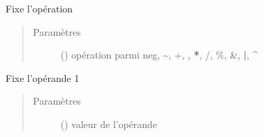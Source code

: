 \documentclass[letterpaper,10pt,french]{sphinxmanual}
\begin{document}
\begin{fulllineitems}
\begin{fulllineitems}
\end{fulllineitems}


\begin{fulllineitems}
\label{\detokenize{executeurcomponents:executeurcomponents.UalComponent.setOperation}}
Fixe l’opération
\begin{quote}\begin{description}
\item[{Paramètres}] \leavevmode
{} () \textendash{} opération parmi neg, \textasciitilde{}, +, \sphinxhyphen{}, {\color{red}\bfseries{}*}, /, \%, \&, {\color{red}\bfseries{}|}, \textasciicircum{}

\end{description}\end{quote}

\end{fulllineitems}


\begin{fulllineitems}
\label{\detokenize{executeurcomponents:executeurcomponents.UalComponent.writeFirstOperand}}
Fixe l’opérande 1
\begin{quote}\begin{description}
\item[{Paramètres}] \leavevmode
{} (\sphinxstyleliteralemphasis{\sphinxupquote{{[}}}{\hyperref[\detokenize{executeurcomponents:executeurcomponents.DataValue}]{\sphinxcrossref{\sphinxstyleliteralemphasis{\sphinxupquote{DataValue}}}}}\sphinxstyleliteralemphasis{\sphinxupquote{,}}\sphinxstyleliteralemphasis{\sphinxupquote{{]}}}) \textendash{} valeur de l’opérande

\end{description}\end{quote}


\end{fulllineitems}
\end{fulllineitems}
\end{document}
